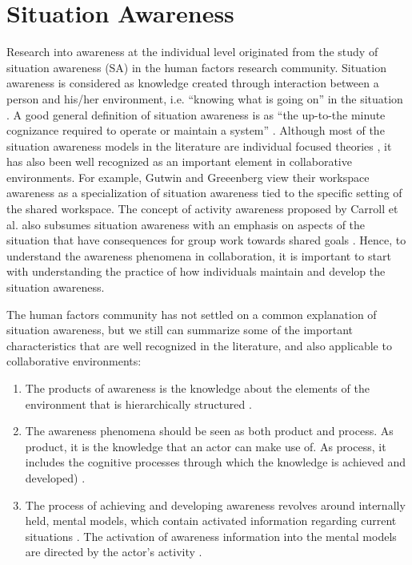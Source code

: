 \section{Situation Awareness}
\label{sec:awareness_in_individuals}
Research into awareness at the individual level originated from the study of situation awareness (SA) in the human factors research community. Situation awareness is considered as knowledge created through interaction between a person and his/her environment, i.e. ``knowing what is going on'' in the situation \cite{Endsley1995}. A good general definition of situation awareness is as ``the up-to-the minute cognizance required to operate or maintain a system'' \cite{Adams1995}. Although most of the situation awareness models in the literature are individual focused theories \cite{Salmon2008}, it has also been well recognized as an important element in collaborative environments. For example, Gutwin and Greeenberg \cite{Gutwin2002} view their workspace awareness as a specialization of situation awareness tied to the specific setting of the shared workspace. The concept of activity awareness proposed by Carroll et al. also subsumes situation awareness with an emphasis on aspects of the situation that have consequences for group work towards shared goals \cite{carroll2003a}. Hence, to understand the awareness phenomena in collaboration, it is important to start with understanding the practice of how individuals maintain and develop the situation awareness.

The human factors community has not settled on a common explanation of situation awareness, but we still can summarize some of the important characteristics that are well recognized in the literature, and also applicable to collaborative environments:

\begin{enumerate}
	\item The products of awareness is the knowledge about the elements of the environment that is hierarchically structured \cite{Endsley1995}.
	\item The awareness phenomena should be seen as both product and process. As product, it is the knowledge that an actor can make use of. As process, it includes the cognitive processes through which the knowledge is achieved and developed) \cite{Adams1995}.
	\item The process of achieving and developing awareness revolves around internally held, mental models, which contain activated information regarding current situations \cite{Smith1995}. The activation of awareness information into the mental models are directed by the actor's activity \cite{Bedny1999}.
\end{enumerate}

